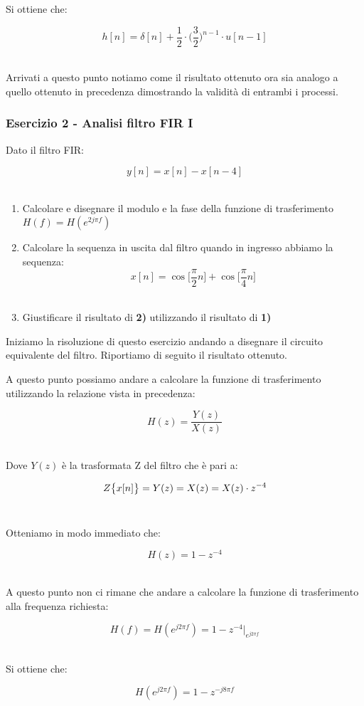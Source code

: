 \documentclass[../main.tex]{subfiles}
\begin{document}
Si ottiene che:

\[ h[n] = \delta[n] + \frac{1}{2} \cdot \bigg(\frac{3}{2}\bigg)^{n-1}  \cdot u[n-1]\]\

Arrivati a questo punto notiamo come il risultato ottenuto ora sia analogo a quello ottenuto in precedenza dimostrando la validità di entrambi i processi.

\subsubsection{Esercizio 2 - Analisi filtro FIR I}

Dato il filtro FIR:

\[ y[n] = x[n] - x[n-4]  \]\

\begin{enumerate}
	\item[\textbf{1)}] Calcolare e disegnare il modulo e la fase della funzione di trasferimento $H(f) = H(e^{2j\pi f})$
	\item[\textbf{2)}] Calcolare la sequenza in uscita dal filtro quando in ingresso abbiamo la sequenza: \[ x[n] = \cos\bigg[ \frac{\pi}{2} n \bigg] + \cos\bigg[ \frac{\pi}{4} n \bigg] \]\
	\item[\textbf{3)}] Giustificare il risultato di \textbf{2)} utilizzando il risultato di \textbf{1)}
\end{enumerate}


Iniziamo la risoluzione di questo esercizio andando a disegnare il circuito equivalente del filtro.
Riportiamo di seguito il risultato ottenuto.


A questo punto possiamo andare a calcolare la funzione di trasferimento utilizzando la relazione vista in precedenza:

\[ H(z) = \frac{Y(z)}{X(z)}\]\

Dove $Y(z)$ è la trasformata Z del filtro che è pari a:

\[ Z\big{\{} x[n] \big{\}} = Y(z) = X(z) = X(z) \cdot z^{-4} \]\

Otteniamo in modo immediato che:

\[  H(z) = 1 - z^{-4}  \]\

A questo punto non ci rimane che andare a calcolare la funzione di trasferimento alla frequenza richiesta:

\[ H(f) = H(e^{j2\pi f})  = 1-z^{-4}\big|_{e^{j2\pi f}} \]\

Si ottiene che:

\[ H(e^{j2\pi f}) = 1 - z^{-j8\pi f}  \]\
\end{document}
